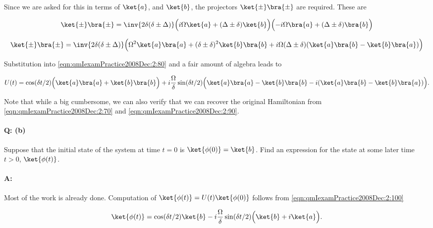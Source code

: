 Since we are asked for this in terms of $\ket{a}$, and $\ket{b}$, the projectors $\ket{\pm}\bra{\pm}$ are required.  These are

\begin{align*}
\ket{\pm}\bra{\pm} 
&= \inv{2 \delta (\delta \pm \Delta)}
\Bigl( i \Omega \ket{a} + (\Delta \pm \delta) \ket{b} \Bigr)
\Bigl( -i \Omega \bra{a} + (\Delta \pm \delta) \bra{b} \Bigr) \\
\end{align*}

\begin{equation}\label{eqn:qmIexamPractice2008Dec:2:90}
\ket{\pm}\bra{\pm} 
= \inv{2 \delta (\delta \pm \Delta)}
\Bigl(
\Omega^2 \ket{a}\bra{a}
+(\delta \pm \delta)^2 \ket{b}\bra{b}
+i \Omega (\Delta \pm \delta) (
\ket{a}\bra{b}
-\ket{b}\bra{a}
)
\Bigr)
\end{equation}

Substitution into \ref{eqn:qmIexamPractice2008Dec:2:80} and a fair amount of algebra leads to

\begin{equation}\label{eqn:qmIexamPractice2008Dec:2:100}
U(t) = 
\cos(\delta t/2) \Bigl( \ket{a}\bra{a} + \ket{b}\bra{b} \Bigr)
+ i \frac{\Omega}{\delta} \sin(\delta t/2) \Bigl( 
\ket{a}\bra{a} - \ket{b}\bra{b} 
-i (\ket{a}\bra{b} - \ket{b}\bra{a} )
\Bigr).
\end{equation}

Note that while a big cumbersome, we can also verify that we can recover the original Hamiltonian from \ref{eqn:qmIexamPractice2008Dec:2:70} and \ref{eqn:qmIexamPractice2008Dec:2:90}.

\paragraph{Q: (b)}

Suppose that the initial state of the system at time $t = 0$ is $\ket{\phi(0)}= \ket{b}$.  Find an expression for the state at some later time $t > 0$, $\ket{\phi(t)}$.

\paragraph{A:}

Most of the work is already done.  Computation of $\ket{\phi(t)} = U(t) \ket{\phi(0)}$ follows from \ref{eqn:qmIexamPractice2008Dec:2:100}

\begin{equation}\label{eqn:qmIexamPractice2008Dec:2:110}
\ket{\phi(t)} =
\cos(\delta t/2) \ket{b}
- i \frac{\Omega}{\delta} \sin(\delta t/2) \Bigl( 
\ket{b} +i \ket{a}
\Bigr).
\end{equation}

